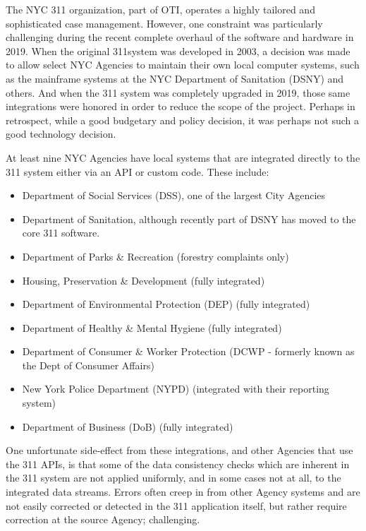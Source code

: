 \documentclass[12pt, titlepage]{article}
\begin{document}
The NYC 311 organization, part of OTI, operates a highly tailored and sophisticated case
management. However, one constraint was particularly challenging during the recent complete overhaul
of the software and hardware in 2019. When the original 311system was developed in 2003, 
a decision was made to allow select NYC Agencies to maintain their own local computer systems, 
such as the mainframe systems at the NYC Department of Sanitation (DSNY) and others. 
And when the 311 system was completely upgraded in 2019, those
same integrations were honored in order to reduce the scope of the project. Perhaps in
retrospect, while a good budgetary and policy decision, it was perhaps not such a good technology decision.

At least nine NYC Agencies have local systems that are integrated directly to the 311 system either via
an API or custom code. These include:

\begin{itemize}
	\item Department of Social Services (DSS), one of the largest City Agencies
	\item Department of Sanitation, although recently part of DSNY has moved to the core 311 software.
	\item Department of Parks \& Recreation (forestry complaints only)
	\item Housing, Preservation \& Development (fully integrated)
	\item Department of Environmental Protection (DEP) (fully integrated)
	\item Department of Healthy \& Mental Hygiene (fully integrated) 
	\item Department of Consumer \& Worker Protection (DCWP - formerly known as the Dept of Consumer Affairs)
	\item New York Police Department (NYPD) (integrated with their reporting system)
	\item Department of Business (DoB) (fully integrated)
\end{itemize}

One unfortunate side-effect from these integrations, and other Agencies that use the 311 APIs, is that some of the data consistency
checks which are inherent in the 311 system are not applied uniformly, and in some cases not at all, to the integrated data streams.
Errors often creep in from other Agency systems and are not easily corrected or detected in the 311 application itself,
but rather require correction at the source Agency; challenging.
\end{document}
